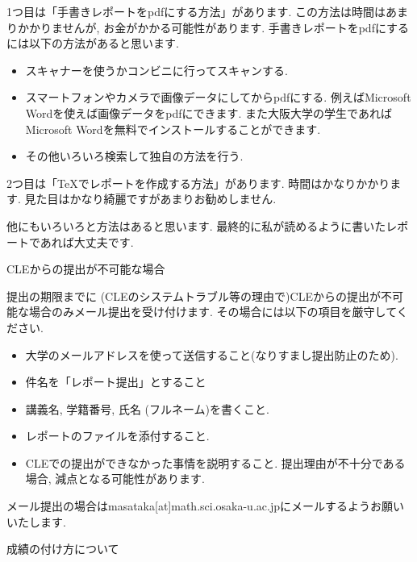 \documentclass[dvipdfmx,a4paper,11pt]{article}
\theoremstyle{definition}
\begin{document}
1つ目は「手書きレポートをpdfにする方法」があります.
この方法は時間はあまりかかりませんが, お金がかかる可能性があります.
手書きレポートをpdfにするには以下の方法があると思います.
\begin{itemize}
\setlength{\parskip}{0cm} %
  \setlength{\itemsep}{0cm}
\item スキャナーを使うかコンビニに行ってスキャンする.
\item スマートフォンやカメラで画像データにしてからpdfにする. 例えばMicrosoft Wordを使えば画像データをpdfにできます. また大阪大学の学生であればMicrosoft Wordを無料でインストールすることができます.
\item その他いろいろ検索して独自の方法を行う.
\end{itemize}

2つ目は「TeXでレポートを作成する方法」があります.
時間はかなりかかります. 見た目はかなり綺麗ですがあまりお勧めしません.
\vspace{11pt}

他にもいろいろと方法はあると思います. 最終的に私が読めるように書いたレポートであれば大丈夫です.

\vspace{11pt}
 \hspace{-11pt}
{\Large CLEからの提出が不可能な場合}
\vspace{11pt}

提出の期限までに (CLEのシステムトラブル等の理由で)CLEからの提出が不可能な場合のみメール提出を受け付けます.
その場合には以下の項目を厳守してください.
\begin{itemize}
\setlength{\parskip}{0cm} %
  \setlength{\itemsep}{0cm}
\item 大学のメールアドレスを使って送信すること(なりすまし提出防止のため).
\item 件名を「レポート提出」とすること
\item 講義名, 学籍番号, 氏名 (フルネーム)を書くこと.
\item レポートのファイルを添付すること.
\item CLEでの提出ができなかった事情を説明すること. 提出理由が不十分である場合, 減点となる可能性があります.
\end{itemize}

メール提出の場合はmasataka[at]math.sci.osaka-u.ac.jpにメールするようお願いいたします.

\newpage
 \hspace{-11pt}
{\Large  成績の付け方について }
\vspace{11pt}
\end{document}
